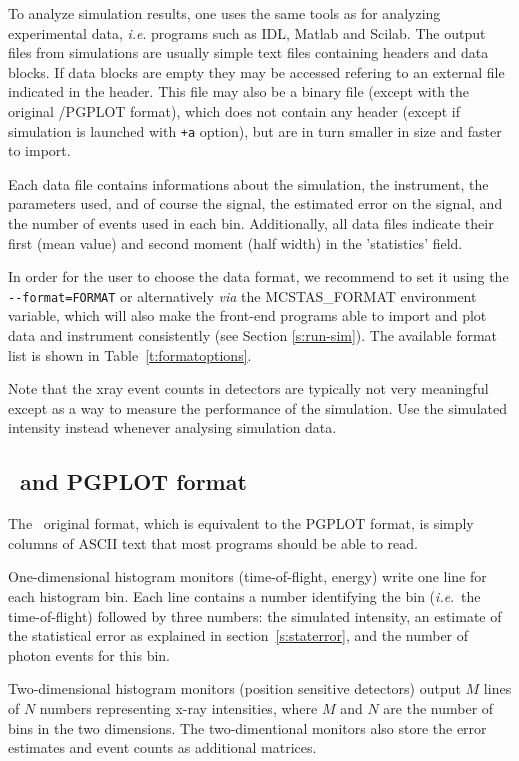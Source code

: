To analyze simulation results, one uses the same tools as for analyzing
experimental data, \textit{i.e}. programs such as IDL, Matlab and Scilab.
The output files from simulations are usually simple text files containing headers and data blocks. If data blocks are empty they may be accessed refering to an external file indicated in the header. This file may also be a binary file (except with the original \MCX /PGPLOT format), which does not contain any header (except if simulation is launched with \verb|+a| option), but are in turn smaller in size and faster to import.

Each data file contains informations about the simulation, the instrument, the parameters used, and of course the signal, the estimated error on the signal, and the number of events used in each bin. Additionally, all data files indicate their first (mean value) and second moment (half width) in the 'statistics' field.

In order for the user to choose the data format, we recommend to set it using the \verb+--format=FORMAT+ or alternatively \textit{via} the MCSTAS\_FORMAT environment variable, which will also make the front-end programs able to import and plot data and instrument consistently (see Section \ref{s:run-sim}). The available format list is shown in Table~\ref{t:formatoptions}. 

Note that the xray event counts in detectors are typically not very
meaningful except as a way to measure the performance of the
simulation. Use the simulated intensity instead whenever analysing
simulation data.

\subsection{\MCX\ and PGPLOT format}
 
The \MCX\ original format, which is equivalent to the PGPLOT format, is simply columns of ASCII text that most programs should
be able to read.

One-dimensional histogram monitors (time-of-flight, energy)
write one line for each histogram bin. Each line contains a number
identifying the bin (\textit{i.e}.\ the time-of-flight) followed by
three numbers: the simulated intensity, an estimate of the statistical
error as explained in section~\ref{s:staterror}, and the number of
photon events for this bin.

Two-dimensional histogram monitors (position sensitive detectors)
output $M$ lines of $N$ numbers representing x-ray intensities, where
$M$ and $N$ are the number of bins in the two dimensions. The
two-dimentional monitors also store the error estimates and event counts as additional matrices.

